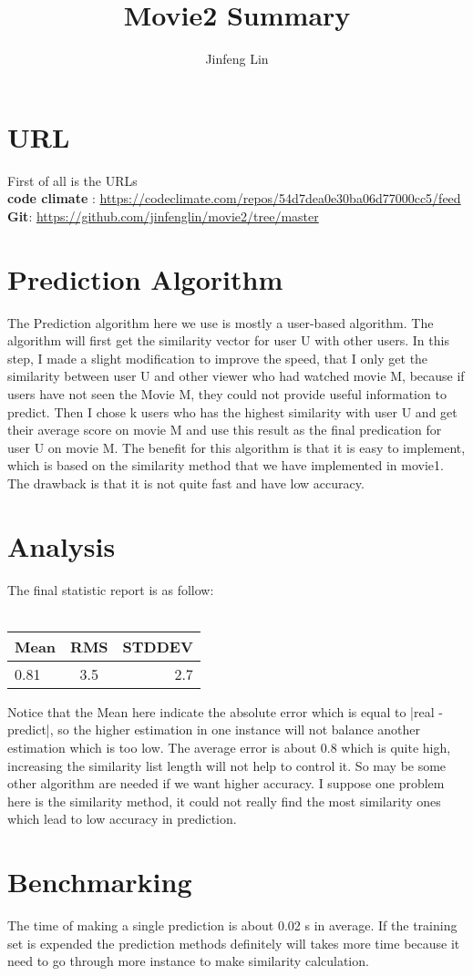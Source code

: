 \documentclass{article}
\begin{document}
\title{Movie2 Summary}
\author {Jinfeng Lin}
\maketitle
\clearpage
\section{URL}
\indent \par First of all is the URLs \\
 \textbf {code climate} : \url{https://codeclimate.com/repos/54d7dea0e30ba06d77000cc5/feed}\\
\textbf {Git}: \url{https://github.com/jinfenglin/movie2/tree/master}\\
\section{Prediction Algorithm}
\indent \par The Prediction algorithm here we use is mostly a user-based algorithm. The algorithm will first get the similarity vector for user U with other users. In this step, I made a slight modification to improve the speed, that I only get the similarity between user U and other viewer who had watched movie M, because if users have not seen the Movie M, they could not provide useful information to predict.  Then I chose k users who has the highest similarity with user U and get their average score on movie M and use this result as the final predication for user U on movie M. The benefit for this algorithm is that it is easy to implement, which is based on the similarity method that we have implemented in movie1. The drawback is that it is not quite fast and have low accuracy.
\section {Analysis}
\indent \par The final statistic report is as follow:\\
\\
\begin {tabular}{| l | c | r|}
\hline
Mean & RMS & STDDEV\\
\hline
0.81 & 3.5&2.7\\
\hline
\end {tabular}
Notice that the Mean here indicate the absolute error which is equal to |real - predict|, so the higher estimation in one instance will not balance another estimation which is too low. The average error is about 0.8 which is quite high, increasing the similarity list length will not help to control it. So may be some other algorithm are needed if we want higher accuracy. I suppose one problem here is the similarity method, it could not really find the most similarity ones which lead to low accuracy in prediction.
 

\section{Benchmarking}
The time of making a single prediction is about 0.02 s in average. If the training set is expended the prediction methods definitely will takes more time because it need to go through more instance to make similarity calculation.
\end{document}
